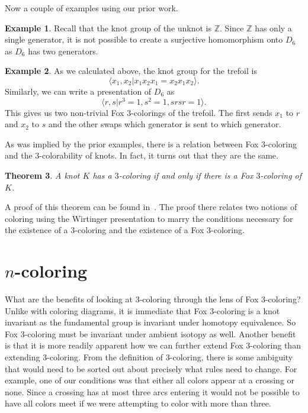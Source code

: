 \documentclass[12pt]{amsart}
\newtheorem{theorem}{Theorem}[section]
\theoremstyle{definition}
\newtheorem{example}[theorem]{Example}
\theoremstyle{remark}
\numberwithin{equation}{section}
\newcommand{\bb}[1]{\mathbb{#1}}
\begin{document}
Now a couple of examples using our prior work.

\begin{example}
  Recall that the knot group of the unknot is $\bb{Z}$. Since
  $\bb{Z}$ has only a single generator, it is not possible to
  create a surjective homomorphism onto $D_6$ as $D_6$ has
  two generators.
\end{example}

\begin{example}
  As we calculated above, the knot group for the trefoil is
  \[
    \langle x_1,x_2| x_1x_2x_1=x_2x_1x_2\rangle.
  \]
  Similarly, we can write a presentation of $D_6$ as
  \[
    \langle r,s| r^3=1, s^2=1,srsr=1\rangle.
  \]
  This gives us two non-trivial Fox $3$-colorings of the trefoil.
  The first sends $x_1$ to $r$ and $x_2$ to $s$ and the
  other swaps which generator is sent to which generator.
\end{example}

As was implied by the prior examples, there is a relation between
Fox $3$-coloring and the $3$-colorability of knots. In fact, it turns
out that they are the same.

\begin{theorem}
  A knot $K$ has a $3$-coloring if and only if there is a
  Fox $3$-coloring of $K$.
\end{theorem}

A proof of this theorem can be found in~\cite{medwid}. 
The proof there relates two notions of coloring using
the Wirtinger presentation to marry the conditions necessary
for the existence of a $3$-coloring and the existence of a Fox
$3$-coloring.

\section{$n$-coloring}
\label{sec:n-coloring}

What are the benefits of looking at $3$-coloring through
the lens of Fox $3$-coloring? Unlike with coloring diagrams,
it is immediate that Fox $3$-coloring is a knot invariant
as the fundamental group is invariant under homotopy equivalence.
So Fox $3$-coloring must be invariant under ambient isotopy as well. Another benefit
is that it is more readily apparent how we can further
extend Fox $3$-coloring than extending $3$-coloring. From
the definition of $3$-coloring, there is some ambiguity that
would need to be sorted out about precisely what rules need
to change. For example, one of our conditions was that either
all colors appear at a crossing or none. Since a crossing has
at most three arcs entering it would not be possible to have
all colors meet if we were attempting to color with more than three.
\end{document}
